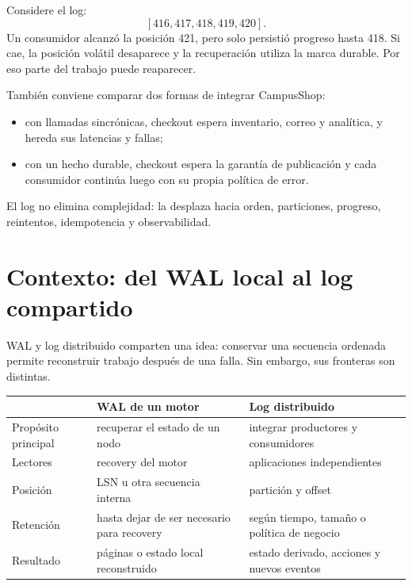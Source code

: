 \documentclass[variant=apuntes,cover=institutional,mode=screen]{ua-engineering-v6-article}
\begin{document}
Considere el log:
\[
[416,417,418,419,420].
\]
Un consumidor alcanzó la posición 421, pero solo persistió progreso hasta 418. Si cae, la posición volátil desaparece y la recuperación utiliza la marca durable. Por eso parte del trabajo puede reaparecer.

\begin{center}
\end{center}

También conviene comparar dos formas de integrar CampusShop:

\begin{itemize}
\item con llamadas sincrónicas, checkout espera inventario, correo y analítica, y hereda sus latencias y fallas;
\item con un hecho durable, checkout espera la garantía de publicación y cada consumidor continúa luego con su propia política de error.
\end{itemize}

El log no elimina complejidad: la desplaza hacia orden, particiones, progreso, reintentos, idempotencia y observabilidad.

\section{Contexto: del WAL local al log compartido}

WAL y log distribuido comparten una idea: conservar una secuencia ordenada permite reconstruir trabajo después de una falla. Sin embargo, sus fronteras son distintas.

\begin{center}
\begin{tabular}{p{}p{}p{}}
\toprule
 & WAL de un motor & Log distribuido \\
\midrule
Propósito principal & recuperar el estado de un nodo & integrar productores y consumidores \\
Lectores & recovery del motor & aplicaciones independientes \\
Posición & LSN u otra secuencia interna & partición y offset \\
Retención & hasta dejar de ser necesario para recovery & según tiempo, tamaño o política de negocio \\
Resultado & páginas o estado local reconstruido & estado derivado, acciones y nuevos eventos \\
\bottomrule
\end{tabular}
\end{center}
\end{document}
